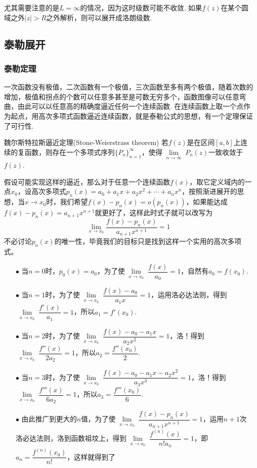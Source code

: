 \documentclass[main.tex]{subfiles}
\begin{document}
尤其需要注意的是\(L=\infty\)的情况，因为这时级数可能不收敛. 如果\(f(z)\)在某个圆域之外\(|z| > R\)之外解析，则可以展开成洛朗级数.

\subsection{泰勒展开}

\subsubsection{泰勒定理}

一次函数没有极值，二次函数有一个极值，三次函数至多有两个极值，随着次数的增加，极值和拐点的个数可以任意多甚至是可数无穷多个，函数图像可以任意弯曲，由此可以以任意高的精确度逼近任何一个连续函数. 在连续函数上取一个点作为起点，用高次多项式函数逼近连续函数，就是泰勒公式的思想，有一个定理保证了可行性.

\begin{theorem}{魏尔斯特拉斯逼近定理(Stone-Weierstrass theorem)}
    若\(f(z)\)是在区间\([a,b]\)上连续的复函数，则存在一个多项式序列\(\{P_n\}_{n=1}^{\infty}\)，使得\(\lim \limits_{\substack{n \to \infty}} P_n(z)\)一致收敛于\(f(z)\).
\end{theorem}

假设可能实现这样的逼近，那么对于任意一个连续函数\(f(x)\)，取它定义域内的一点\(x_0\)，设高次多项式\(p_n(x)=a_0+a_1x+a_2x^2+\cdots+a_nx^n\)，按照渐进展开的思想，当\(x \to x_0\)时，我们希望\(f(x) - p_n(x) = o(p_n(x))\)，如果能达成\(f(x) - p_n(x) = a_{n+1}x^{n+1}\)就更好了，这样此时式子就可以改写为
\[\lim_{x \to x_0}\frac{f(x)-p_n(x)}{a_{n+1}x^{n+1}} = 1 \]
不必讨论\(p_n(x)\)的唯一性，毕竟我们的目标只是找到这样一个实用的高次多项式。
\begin{itemize}
    \item[\(\bullet\)] 当\(n=0\)时，\(p_0(x)=a_0\)，为了使\(\lim \limits_{\substack{x\to x_0}}\dfrac{f(x)}{a_0}=1\)，自然有\(a_0=f(x_0)\).
    \item[\(\bullet\)] 当\(n=1\)时，为了使\(\lim \limits_{\substack{x\to x_0}}\dfrac{f(x)-a_0}{a_1x}=1\)，运用洛必达法则，得到\(\lim \limits_{\substack{x\to x_0}}\dfrac{f'(x)}{a_1}=1\)，所以\(a_1=f'(x_0)\).
    \item[\(\bullet\)] 当\(n=2\)时，为了使\(\lim \limits_{\substack{x\to x_0}}\dfrac{f(x)-a_0-a_1x}{a_2x^2}=1\)，洛！得到\(\lim \limits_{\substack{x\to x_0}}\dfrac{f''(x)}{2a_2}=1\)，所以\(a_2=\dfrac{f''(x_0)}{2}\).
    \item[\(\bullet\)] 当\(n=3\)时，为了使\(\lim \limits_{\substack{x\to x_0}}\dfrac{f(x)-a_0-a_1x-a_2x^2}{a_3x^3}=1\)，洛！得到\(\lim \limits_{\substack{x\to x_0}}\dfrac{f'''(x)}{6a_2}=1\)，所以\(a_3=\dfrac{f'''(x_0)}{6}\).
    \item[\(\bullet\)] 由此推广到更大的\(n\)值，为了使\(\lim \limits_{\substack{x\to x_0}}\dfrac{f(x)-p_n(x)}{a_{n+1}x^{n+1}}=1\)，运用\(n+1\)次洛必达法则，洛到函数祖坟上，得到\(\lim \limits_{\substack{x\to x_0}}\dfrac{f^{(n)}(x)}{n!a_n}=1\)，即\(a_n=\dfrac{f^{(n)}(x_0)}{n!}\)，这样就得到了
\end{itemize}
\end{document}
